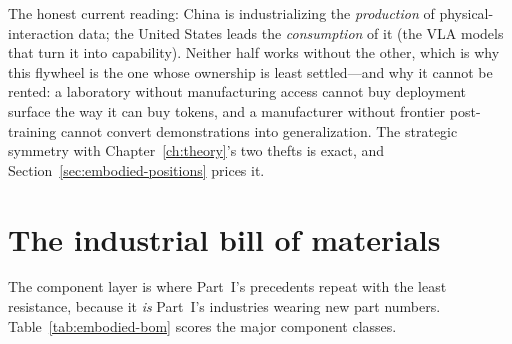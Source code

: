 The honest current reading: China is industrializing the \emph{production} of physical-interaction data; the United States leads the \emph{consumption} of it (the VLA models that turn it into capability). Neither half works without the other, which is why this flywheel is the one whose ownership is least settled---and why it cannot be rented: a laboratory without manufacturing access cannot buy deployment surface the way it can buy tokens, and a manufacturer without frontier post-training cannot convert demonstrations into generalization. The strategic symmetry with Chapter~\ref{ch:theory}'s two thefts is exact, and Section~\ref{sec:embodied-positions} prices it.

\section{The industrial bill of materials}
\label{sec:embodied-bom}

The component layer is where Part~I's precedents repeat with the least resistance, because it \emph{is} Part~I's industries wearing new part numbers. Table~\ref{tab:embodied-bom} scores the major component classes.

